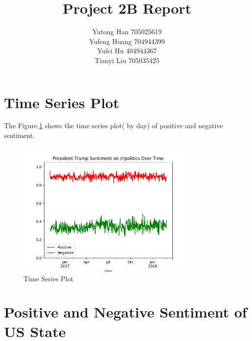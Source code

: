 \documentclass[12pt]{article}
\begin{document}
 
 
\title{Project 2B Report}
\author{Yutong Han 705025619 \\
		Yufeng Huang 704944399\\
		Yufei Hu 404944367\\
		Tianyi Liu 705035425 \\
		}
\maketitle
 
\section{Time Series Plot}

The Figure.\ref{fig:1} shows the time series plot( by day) of positive and negative sentiment.

\begin{figure}[!h]
     \begin{center}
                  \includegraphics[width=0.8\textwidth]{../plots/part1.png}
    \end{center}
    \caption{%
       Time Series Plot 
     }%
   \label{fig:1}
\end{figure}



\section{Positive and Negative Sentiment of US State}
\end{document}
